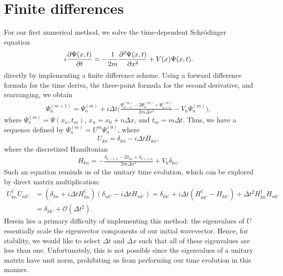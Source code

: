 \appendix

\section{Finite differences}
\label{app:finite-differences}

For our first numerical method, we solve the time-dependent Schr\"{o}dinger equation 
\begin{align}
    i \pdv{\Psi(x,t)}{t} = -\frac{1}{2m} \pdv[2]{\Psi(x,t)}{x} + V(x) \Psi(x,t)
.\end{align}
directly by implementing a finite difference scheme.
Using a forward difference formula for the time deriva, the three-point formula for the second derivative, and rearranging, we obtain
\begin{align}
    \Psi_{n}^{(m + 1)} = \Psi_{n}^{(m)} + i \Delta t \Bigg( \frac{\Psi_{n-1}^{(m)} - 2 \Psi_{n}^{(m)} + \Psi_{n+1}^{(m)}}{2m \Delta x^2} - V_{n} \Psi_{n}^{(m)} \Bigg)
,\end{align}
where $\Psi_{n}^{(m)} = \Psi(x_n,t_{m})$, $x_{n} = x_0 + n \Delta x$, and $t_{m} = m \Delta t$.
Thus, we have a sequence defined by $\Psi_{n}^{(m)} = U^{m} \Psi_{n}^{(0)}$, where
\begin{align}
    U_{kn} = \delta_{kn} - i \Delta t H_{kn}
,\end{align}
where the discretized Hamiltonian
\begin{align}
    H_{kn} = -\frac{\delta_{k-1,n} - 2 \delta_{kn} + \delta_{k+1,n}}{2m \Delta x^2} + V_{k} \delta_{kn}
.\end{align}
Such an equation reminds us of the unitary time evolution, which can be explored by direct matrix multiplication:
\begin{align}
    U_{kn}^{\dagger} U_{nk'} &= ( \delta_{kn} + i \Delta t H_{kn}^{\dagger} ) ( \delta_{nk'} - i \Delta t H_{nk'} ) = \delta_{k k'} + i \Delta t ( H_{kk'}^{\dagger} - H_{kk'} ) + \Delta t^2 H_{kn}^{\dagger} H_{nk'} \nonumber \\
    &= \delta_{kk'} + \mathcal{O}(\Delta t^2)
.\end{align}
Herein lies a primary difficulty of implementing this method: the eigenvalues of $U$ essentially scale the eigenvector components of our initial wavevector.
Hence, for stability, we would like to select $\Delta t$ and $\Delta x$ such that all of these eigenvalues are less than one.
Unfortunately, this is not possible since the eigenvalues of a unitary matrix have unit norm, prohibiting us from performing our time evolution in this manner.


